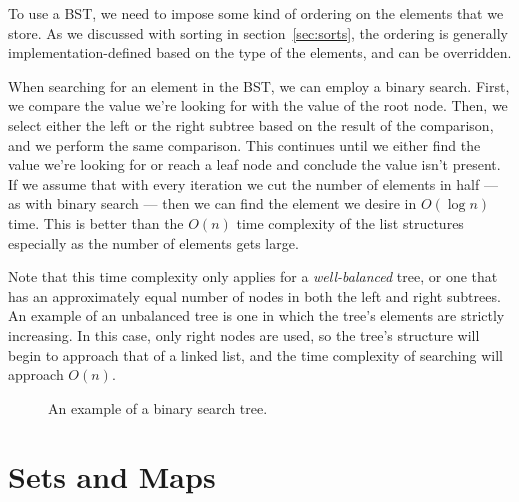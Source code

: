 To use a BST, we need to impose some kind of ordering on the elements that we store. As we discussed with sorting in section~\ref{sec:sorts}, the ordering is generally implementation-defined based on the type of the elements, and can be overridden.

When searching for an element in the BST, we can employ a binary search. First, we compare the value we're looking for with the value of the root node. Then, we select either the left or the right subtree based on the result of the comparison, and we perform the same comparison. This continues until we either find the value we're looking for or reach a leaf node and conclude the value isn't present. If we assume that with every iteration we cut the number of elements in half --- as with binary search --- then we can find the element we desire in $O(\log n)$ time. This is better than the $O(n)$ time complexity of the list structures especially as the number of elements gets large.

Note that this time complexity only applies for a \textit{well-balanced} tree, or one that has an approximately equal number of nodes in both the left and right subtrees. An example of an unbalanced tree is one in which the tree's elements are strictly increasing. In this case, only right nodes are used, so the tree's structure will begin to approach that of a linked list, and the time complexity of searching will approach $O(n)$.


\begin{figure}
\centering
{}
\caption{An example of a binary search tree.}
\label{fig:tree2}
\end{figure}



\section{Sets and Maps}

